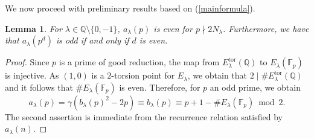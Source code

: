 \documentclass[12pt]{amsart}
\newtheorem{lem}{Lemma}[section]
\newcommand{\Q}{\mathbb{Q}}
\newcommand{\tor}{\mathrm{tor}}
\numberwithin{equation}{section}
\begin{document}
We now proceed with preliminary results based on (\ref{mainformula}).
\begin{lem}{\label{TM2}}
For $\lambda\in \mathbb{Q}\setminus \{0, -1\}$, $a_\lambda(p)$ is even for $p\nmid 2N_\lambda$. Furthermore, we have that $a_\lambda(p^d)$ is odd if and only if $d$ is even.
\end{lem}
\begin{proof}
Since $p$ is a prime of good reduction, the map from $E_{\lambda}^{\tor}(\Q)$ to $E_\lambda(\mathbb{F}_p)$ is injective. As $(1,0)$ is a $2$-torsion point for $E_\lambda$, we obtain that $2\mid \# E_{\lambda}^{\tor}(\mathbb{Q})$ and it follows that $\#E_\lambda(\mathbb{F}_p)$ is even. Therefore, for $p$ an odd prime, we obtain
$$a_{\lambda}(p)=\gamma(b_\lambda(p)^2-2p)\equiv b_\lambda(p)\equiv p+1-\#E_\lambda(\mathbb{F}_p)\bmod 2.$$
The second assertion is immediate from the recurrence relation satisfied by $a_\lambda(n)$.
\end{proof}
\end{document}
